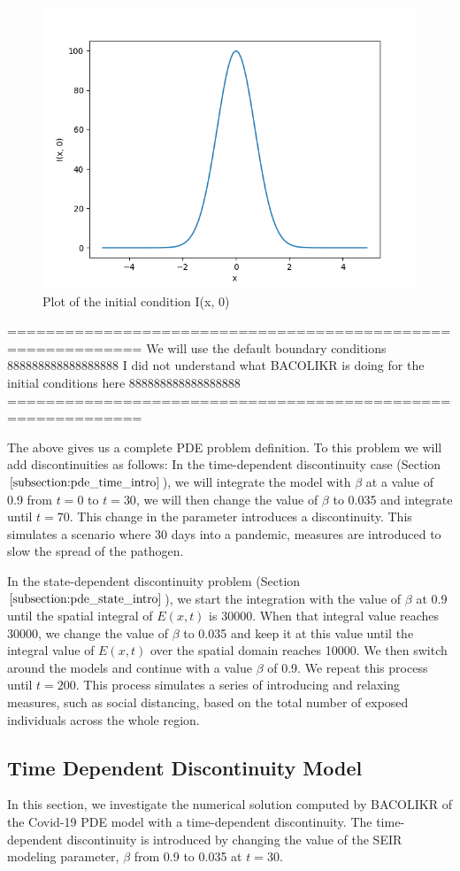 \documentclass{article}
\begin{document}
\begin{figure}[H]
\centering
\includegraphics[width=0.7\linewidth]{./figures/pde_I_0}
\caption{Plot of the initial condition I(x, 0)}
\label{fig:pde_I_0}
\end{figure}

============================================================
We will use the default boundary conditions 888888888888888888 I did not understand what BACOLIKR is doing for the initial conditions here 888888888888888888
============================================================

The above gives us a complete PDE problem definition. To this problem we will add discontinuities as follows: 
In the time-dependent discontinuity case (Section $\ref{subsection:pde_time_intro}$), we will integrate the model with $\beta$ at a value of 0.9 from $t=0$ to $t=30$, we will then change the value of $\beta$ to 0.035 and integrate until $t=70$. This change in the parameter introduces a discontinuity. This simulates a scenario where 30 days into a pandemic, measures are introduced to slow the spread of the pathogen.

In the state-dependent discontinuity problem (Section $\ref{subsection:pde_state_intro}$), we start the integration with the value of $\beta$ at 0.9 until the spatial integral of $E(x, t)$ is 30000. When that integral value reaches 30000, we change the value of $\beta$ to 0.035 and keep it at this value until the integral value of $E(x, t)$ over the spatial domain reaches 10000. We then switch around the models and continue with a value $\beta$ of 0.9. We repeat this process until $t=200$. This process simulates a series of introducing and relaxing measures, such as social distancing, based on the total number of exposed individuals across the whole region.

\subsection{Time Dependent Discontinuity Model}
\label{subsection:pde_time_intro}
In this section, we investigate the numerical solution computed by BACOLIKR of the Covid-19 PDE model with a time-dependent discontinuity. The time-dependent discontinuity is introduced by changing the value of the SEIR modeling parameter, $\beta$ from 0.9 to 0.035 at $t=30$.
\end{document}
